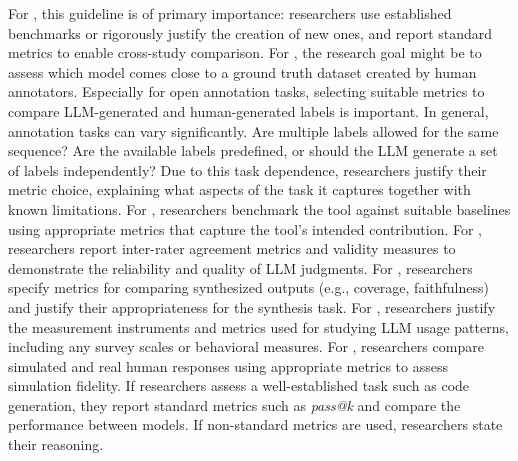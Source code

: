For \benchmarkingtasks, this guideline is of primary importance: researchers \must use established benchmarks or rigorously justify the creation of new ones, and \must report standard metrics to enable cross-study comparison.
For \annotators, the research goal might be to assess which model comes close to a ground truth dataset created by human annotators.
Especially for open annotation tasks, selecting suitable metrics to compare LLM-generated and human-generated labels is important.
In general, annotation tasks can vary significantly.
Are multiple labels allowed for the same sequence? Are the available labels predefined, or should the LLM generate a set of labels independently?
Due to this task dependence, researchers \must justify their metric choice, explaining what aspects of the task it captures together with known limitations.
For \newtools, researchers \should benchmark the tool against suitable baselines using appropriate metrics that capture the tool's intended contribution.
For \judges, researchers \should report inter-rater agreement metrics and validity measures to demonstrate the reliability and quality of LLM judgments.
For \synthesis, researchers \should specify metrics for comparing synthesized outputs (e.g., coverage, faithfulness) and justify their appropriateness for the synthesis task.
For \llmusage, researchers \should justify the measurement instruments and metrics used for studying LLM usage patterns, including any survey scales or behavioral measures.
For \subjects, researchers \should compare simulated and real human responses using appropriate metrics to assess simulation fidelity.
If researchers assess a well-established task such as code generation, they \should report standard metrics such as \emph{pass@k} and compare the performance between models.
If non-standard metrics are used, researchers \must state their reasoning.


